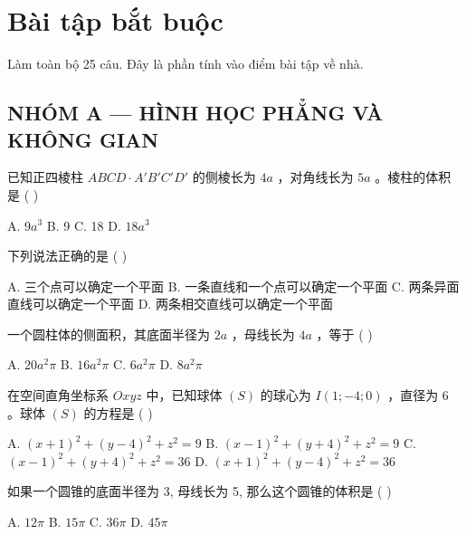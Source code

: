 \documentclass[11pt, a4paper]{article}
\begin{document}

\section{Bài tập bắt buộc}

Làm toàn bộ 25 câu. Đây là phần tính vào điểm bài tập về nhà.

\subsection*{NHÓM A — HÌNH HỌC PHẲNG VÀ KHÔNG GIAN}

\begin{baitap}[1]
已知正四棱柱 $ABCD \cdot A'B'C'D'$ 的侧棱长为 $4a$ ，对角线长为 $5a$ 。棱柱的体积是 ( )
\par\vspace{3pt}
\noindent A. $9a^3$ \quad B. 9 \quad C. 18 \quad D. $18a^3$
\end{baitap}

\begin{baitap}[2]
下列说法正确的是 ( )
\par\vspace{3pt}
\noindent A. 三个点可以确定一个平面 \quad B. 一条直线和一个点可以确定一个平面 \quad C. 两条异面直线可以确定一个平面 \quad D. 两条相交直线可以确定一个平面
\end{baitap}

\begin{baitap}[3]
一个圆柱体的侧面积，其底面半径为 $2a$ ，母线长为 $4a$ ，等于 ( )
\par\vspace{3pt}
\noindent A. $20a^2\pi$ \quad B. $16a^2\pi$ \quad C. $6a^2\pi$ \quad D. $8a^2\pi$
\end{baitap}

\begin{baitap}[4]
在空间直角坐标系 $Oxyz$ 中，已知球体 $(S)$ 的球心为 $I(1;-4;0)$ ，直径为 $6$ 。球体 $(S)$ 的方程是 ( )
\par\vspace{3pt}
\noindent A. $(x + 1)^2 + (y - 4)^2 + z^2 = 9$ \quad B. $(x - 1)^2 + (y + 4)^2 + z^2 = 9$ \quad C. $(x - 1)^2 + (y + 4)^2 + z^2 = 36$ \quad D. $(x + 1)^2 + (y - 4)^2 + z^2 = 36$
\end{baitap}

\begin{baitap}[5]
如果一个圆锥的底面半径为 3, 母线长为 5, 那么这个圆锥的体积是 ( )
\par\vspace{3pt}
\noindent A. $12\pi$ \quad B. $15\pi$ \quad C. $36\pi$ \quad D. $45\pi$
\end{baitap}
\end{document}
